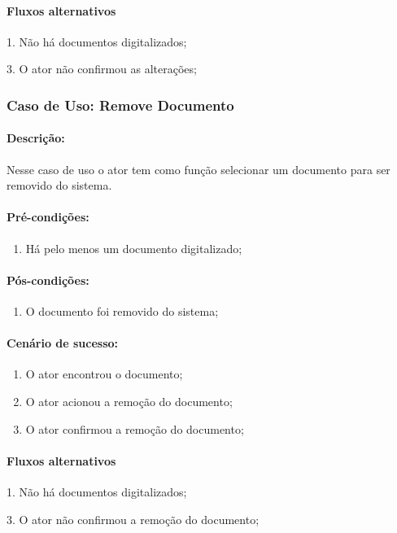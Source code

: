 \paragraph{Fluxos alternativos}
\begin{description}
    \item 1. Não há documentos digitalizados; 
    \item 3. O ator não confirmou as alterações;
\end{description}


\newpage
\subsubsection{Caso de Uso: Remove Documento}

\paragraph{Descrição:} Nesse caso de uso o ator tem como função selecionar um documento para ser removido do sistema.

\paragraph{Pré-condições:}
\begin{enumerate}
    \item Há pelo menos um documento digitalizado;
\end{enumerate}

\paragraph{Pós-condições:} 
\begin{enumerate}
    \item O documento foi removido do sistema;
\end{enumerate}
    
\paragraph{Cenário de sucesso:}
\begin{enumerate}
    \item O ator encontrou o documento;
    \item O ator acionou a remoção do documento;
    \item O ator confirmou a remoção do documento;
\end{enumerate}

\paragraph{Fluxos alternativos}
\begin{description}
    \item 1. Não há documentos digitalizados;
    \item 3. O ator não confirmou a remoção do documento;
\end{description}

